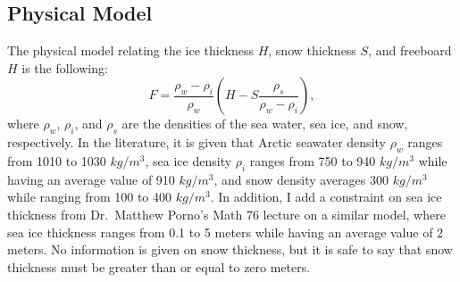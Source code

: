 \documentclass[12pt, letterpaper]{article}
\begin{document}
\subsection{Physical Model}
The physical model relating the ice thickness $H$, snow thickness $S$, and freeboard $H$ is the following:
\[
    F = \frac{\rho_w - \rho_i}{\rho_w} \left( H - S \frac{\rho_s}{\rho_w - \rho_i} \right),
\]
where $\rho_w$, $\rho_i$, and $\rho_s$ are the densities of the sea water, sea ice, and snow, respectively.
In the literature, it is given that Arctic seawater density $\rho_w$ ranges from 1010 to 1030 $kg/m^3$,
sea ice density $\rho_i$ ranges from 750 to 940 $kg/m^3$ while having an average value of 910 $kg / m^3$,
and snow density averages 300 $kg / m^3$ while ranging from 100 to 400 $kg / m^3$. In addition, I add a constraint
on sea ice thickness from Dr.\ Matthew Porno's Math 76 lecture on a similar model, where sea ice thickness ranges
from 0.1 to 5 meters while having an average value of 2 meters. No information is given on snow thickness, but it
is safe to say that snow thickness must be greater than or equal to zero meters.
\end{document}
